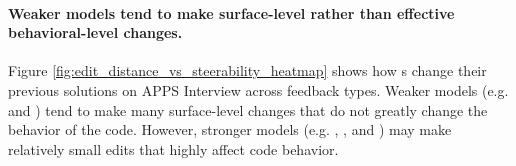 \paragraph{Weaker models tend to make surface-level rather than effective behavioral-level changes.} 
Figure \ref{fig:edit_distance_vs_steerability_heatmap} shows how \cm s change their previous solutions on APPS Interview across feedback types.
Weaker models (e.g. \gemmaSmall{} and \llama) tend to make many surface-level changes that do not greatly change the behavior of the code.
However, stronger models (e.g. \gpt{}, \sonnet, and \qwenLarge) may make relatively small edits that highly affect code behavior.